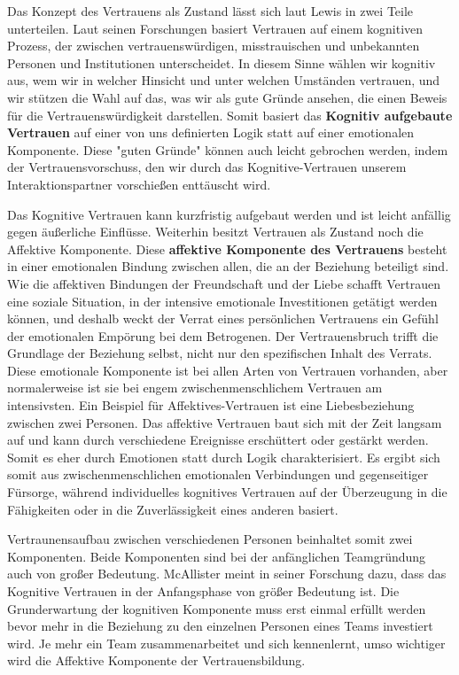 \documentclass[a4paper,11pt]{article}%
\renewcommand{\\}{\vspace*{0.5\baselineskip} \newline}
\begin{document}
Das Konzept des Vertrauens als Zustand lässt sich laut Lewis \citep[p.970-971]{lewis1985trust} in zwei Teile unterteilen.\newline
Laut seinen Forschungen basiert Vertrauen \dq auf einem kognitiven Prozess, der zwischen vertrauenswürdigen, misstrauischen und unbekannten Personen und Institutionen unterscheidet. In diesem Sinne wählen wir kognitiv aus, wem wir in welcher Hinsicht und unter welchen Umständen vertrauen, und wir stützen die Wahl auf das, was wir als \dq gute Gründe\dq{} ansehen, die einen Beweis für die Vertrauenswürdigkeit darstellen.\dq{}\citep[p.970]{lewis1985trust}
Somit basiert das \textbf{Kognitiv aufgebaute Vertrauen} auf einer von uns definierten Logik statt auf einer emotionalen Komponente. Diese "guten Gründe" können auch leicht gebrochen werden, indem der Vertrauensvorschuss, den wir durch das Kognitive-Vertrauen unserem Interaktionspartner vorschießen enttäuscht wird.

Das Kognitive Vertrauen kann kurzfristig aufgebaut werden und ist leicht anfällig gegen äußerliche Einflüsse. 
Weiterhin besitzt Vertrauen als \dq Zustand\dq{} noch die Affektive Komponente.\\ \dq Diese \textbf{affektive Komponente des Vertrauens} besteht in einer emotionalen Bindung zwischen allen, die an der Beziehung beteiligt sind. Wie die affektiven Bindungen der Freundschaft und der Liebe schafft Vertrauen eine soziale Situation, in der intensive emotionale Investitionen getätigt werden können, und deshalb weckt der Verrat eines persönlichen Vertrauens ein Gefühl der emotionalen Empörung bei dem Betrogenen. Der Vertrauensbruch trifft die Grundlage der Beziehung selbst, nicht nur den spezifischen Inhalt des Verrats. Diese emotionale Komponente ist bei allen Arten von Vertrauen vorhanden, aber normalerweise ist sie bei engem zwischenmenschlichem Vertrauen am intensivsten.\dq{} \citep[p.971]{lewis1985trust} \\
Ein Beispiel für Affektives-Vertrauen ist eine Liebesbeziehung zwischen zwei Personen. Das affektive Vertrauen baut sich mit der Zeit langsam auf und kann durch verschiedene Ereignisse erschüttert oder gestärkt werden. Somit es eher durch Emotionen statt durch Logik charakterisiert.
Es ergibt sich somit aus zwischenmenschlichen emotionalen Verbindungen und gegenseitiger Fürsorge, während individuelles kognitives Vertrauen auf der Überzeugung in die Fähigkeiten oder in die Zuverlässigkeit eines anderen basiert. \\

Vertraunensaufbau zwischen verschiedenen Personen beinhaltet somit zwei Komponenten. Beide Komponenten sind bei der anfänglichen Teamgründung auch von großer Bedeutung. McAllister meint in seiner Forschung dazu, dass das Kognitive Vertrauen in der Anfangsphase von größer Bedeutung ist. Die Grunderwartung der kognitiven Komponente muss erst einmal erfüllt werden bevor mehr in die Beziehung zu den einzelnen Personen eines Teams investiert wird. Je mehr ein Team zusammenarbeitet und sich kennenlernt, umso wichtiger wird die Affektive Komponente der Vertrauensbildung. \citep[p.30]{mcallister1995affect}
\end{document}
